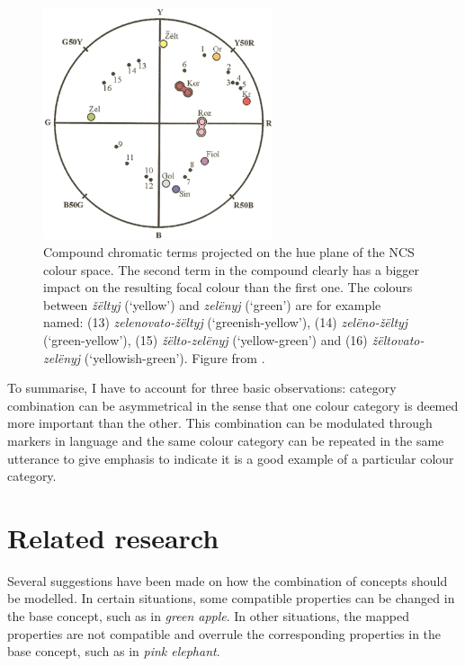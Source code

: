 \begin{figure}[htbp]
  \begin{center}
    \includegraphics[width=0.6\textwidth]{./category-combination/figures/russian-combination.pdf}
    \caption[Compound chromatic terms in Russian]{Compound chromatic
      terms projected on the hue plane of the NCS colour space. The
      second term in the compound clearly has a bigger impact on the
      resulting focal colour than the first one. The colours between
      \textit{\v z\"eltyj} (`yellow') and \textit{zel\"enyj} (`green') are for
      example named: (13) \textit{zelenovato-\v z\"eltyj}
      (`greenish-yellow'), (14) \textit{zel\"eno-\v z\"eltyj} (`green-yellow'),
      (15) \textit{\v z\"elto-zel\"enyj} (`yellow-green') and (16) \textit{\v z\"eltovato-zel\"enyj} (`yellowish-green'). Figure from
      \cite{safuanova07russian}.}
    \label{f:ccs-russian}
  \end{center}
\end{figure}

To summarise, I have to account for three basic observations: category
combination can be asymmetrical in the sense that one colour category
is deemed more important than the other. This combination can be
modulated through markers in language and the same colour category can
be repeated in the same utterance to give emphasis to indicate it is a
good example of a particular colour category.

\section{Related research}
\label{s:ccs-related-research}

Several suggestions have been made on how the combination of concepts
should be modelled. In certain situations, some compatible properties
can be changed in the base concept, such as in \textit{green apple}. In
other situations, the mapped properties are not compatible and
overrule the corresponding properties in the base concept, such as in
\textit{pink elephant}.

